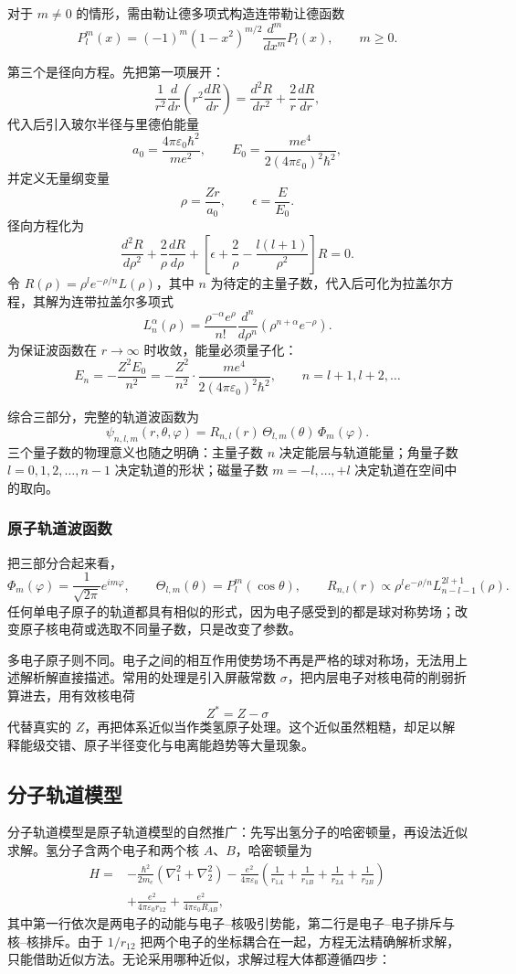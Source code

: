 \documentclass[UTF8]{ctexbook}
\begin{document}
对于 $m\neq0$ 的情形，需由勒让德多项式构造连带勒让德函数
\[
P_l^m(x)=(-1)^m(1-x^2)^{m/2}\frac{d^m}{dx^m}P_l(x),
\qquad m\geq0 .
\]

第三个是径向方程。先把第一项展开：
\[
\frac{1}{r^2}\frac{d}{dr}\left(r^2\frac{dR}{dr}\right)
=\frac{d^2R}{dr^2}+\frac{2}{r}\frac{dR}{dr},
\]
代入后引入玻尔半径与里德伯能量
\[
a_0=\frac{4\pi\varepsilon_0\hbar^2}{me^2},
\qquad
E_0=\frac{me^4}{2(4\pi\varepsilon_0)^2\hbar^2},
\]
并定义无量纲变量
\[
\rho=\frac{Zr}{a_0},\qquad \epsilon=\frac{E}{E_0}.
\]
径向方程化为
\[
\frac{d^2R}{d\rho^2}+\frac{2}{\rho}\frac{dR}{d\rho}
+\left[\epsilon+\frac{2}{\rho}-\frac{l(l+1)}{\rho^2}\right]R=0 .
\]
令 $R(\rho)=\rho^l e^{-\rho/n}L(\rho)$，其中 $n$ 为待定的主量子数，代入后可化为拉盖尔方程，其解为连带拉盖尔多项式
\[
L_n^{\alpha}(\rho)=\frac{\rho^{-\alpha}e^{\rho}}{n!}
\frac{d^n}{d\rho^n}\left(\rho^{n+\alpha}e^{-\rho}\right).
\]
为保证波函数在 $r\to\infty$ 时收敛，能量必须量子化：
\[
E_n=-\frac{Z^2E_0}{n^2}
=-\frac{Z^2}{n^2}\cdot\frac{me^4}{2(4\pi\varepsilon_0)^2\hbar^2},
\qquad n=l+1,l+2,\dots
\]

综合三部分，完整的轨道波函数为
\[
\psi_{n,l,m}(r,\theta,\varphi)
=R_{n,l}(r)\,\Theta_{l,m}(\theta)\,\Phi_m(\varphi).
\]
三个量子数的物理意义也随之明确：主量子数 $n$ 决定能层与轨道能量；角量子数 $l=0,1,2,\dots,n-1$ 决定轨道的形状；磁量子数 $m=-l,\dots,+l$ 决定轨道在空间中的取向。

\subsubsection{原子轨道波函数}

把三部分合起来看，
\[
\Phi_m(\varphi)=\frac{1}{\sqrt{2\pi}}e^{im\varphi},\qquad
\Theta_{l,m}(\theta)=P_l^m(\cos\theta),\qquad
R_{n,l}(r)\propto\rho^l e^{-\rho/n}L_{n-l-1}^{2l+1}(\rho).
\]
任何单电子原子的轨道都具有相似的形式，因为电子感受到的都是球对称势场；改变原子核电荷或选取不同量子数，只是改变了参数。

多电子原子则不同。电子之间的相互作用使势场不再是严格的球对称场，无法用上述解析解直接描述。常用的处理是引入屏蔽常数 $\sigma$，把内层电子对核电荷的削弱折算进去，用有效核电荷
\[
Z^*=Z-\sigma
\]
代替真实的 $Z$，再把体系近似当作类氢原子处理。这个近似虽然粗糙，却足以解释能级交错、原子半径变化与电离能趋势等大量现象。

\subsection{分子轨道模型}

分子轨道模型是原子轨道模型的自然推广：先写出氢分子的哈密顿量，再设法近似求解。氢分子含两个电子和两个核 $A$、$B$，哈密顿量为
\[
\begin{aligned}
H=&-\frac{\hbar^2}{2m_e}\left(\nabla_1^2+\nabla_2^2\right)
-\frac{e^2}{4\pi\varepsilon_0}\left(\frac{1}{r_{1A}}+\frac{1}{r_{1B}}+\frac{1}{r_{2A}}+\frac{1}{r_{2B}}\right)\\
&+\frac{e^2}{4\pi\varepsilon_0 r_{12}}
+\frac{e^2}{4\pi\varepsilon_0 R_{AB}},
\end{aligned}
\]
其中第一行依次是两电子的动能与电子--核吸引势能，第二行是电子--电子排斥与核--核排斥。由于 $1/r_{12}$ 把两个电子的坐标耦合在一起，方程无法精确解析求解，只能借助近似方法。无论采用哪种近似，求解过程大体都遵循四步：
\end{document}
